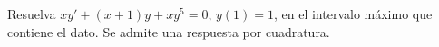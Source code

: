 Resuelva $xy'+(x+1)y+xy^5=0$, $y(1)=1$, en el intervalo máximo que contiene el dato. Se admite una respuesta por cuadratura.

